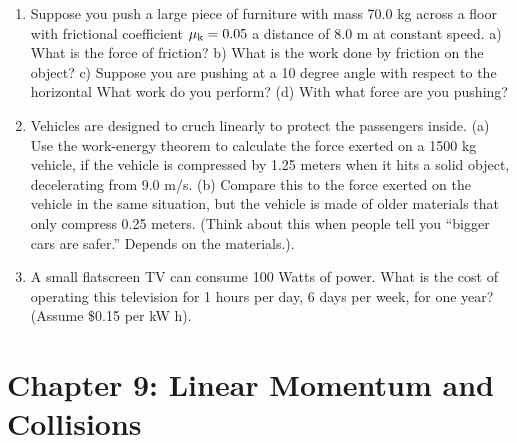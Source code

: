 \documentclass[10pt]{article}
\begin{document}
\begin{enumerate}
\item Suppose you push a large piece of furniture with mass 70.0 kg across a floor with frictional coefficient $\mu_{\rm k} = 0.05$ a distance of 8.0 m at constant speed.  a) What is the force of friction?  b) What is the work done by friction on the object?  c) Suppose you are pushing at a 10 degree angle with respect to the horizontal What work do you perform? (d) With what force are you pushing? \\ \vspace{3cm}
\item  Vehicles are designed to cruch linearly to protect the passengers inside. (a) Use the work-energy theorem to calculate the force exerted on a 1500 kg vehicle, if the vehicle is compressed by 1.25 meters when it hits a solid object, decelerating from 9.0 m/s. (b) Compare this to the force exerted on the vehicle in the same situation, but the vehicle is made of older materials that only compress 0.25 meters. (Think about this when people tell you ``bigger cars are safer.''  Depends on the materials.).  \\ \vspace{3cm}
\item A small flatscreen TV can consume 100 Watts of power.  What is the cost of operating this television for 1 hours per day, 6 days per week, for one year?  (Assume \$0.15 per kW h). \\ \vspace{2cm}
\end{enumerate}

\section{Chapter 9: Linear Momentum and Collisions}
\end{document}
